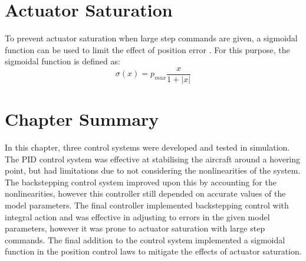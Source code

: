 \section{Actuator Saturation}
To prevent actuator saturation when large step commands are given, a sigmoidal function can be used to limit the effect of position error \cite{Cabecinhas2009}. For this purpose, the sigmoidal function is defined as:
\[\sigma(x)=p_{max}\frac{x}{1+|x|}\]



\section{Chapter Summary}
In this chapter, three control systems were developed and tested in simulation. The PID control system was effective at stabilising the aircraft around a hovering point, but had limitations due to not considering the nonlinearities of the system. The backstepping control system improved upon this by accounting for the nonlinearities, however this controller still depended on accurate values of the model parameters. The final controller implemented backstepping control with integral action and was effective in adjusting to errors in the given model parameters, however it was prone to actuator saturation with large step commands. The final addition to the control system implemented a sigmoidal function in the position control laws to mitigate the effects of actuator saturation.



\clearpage




